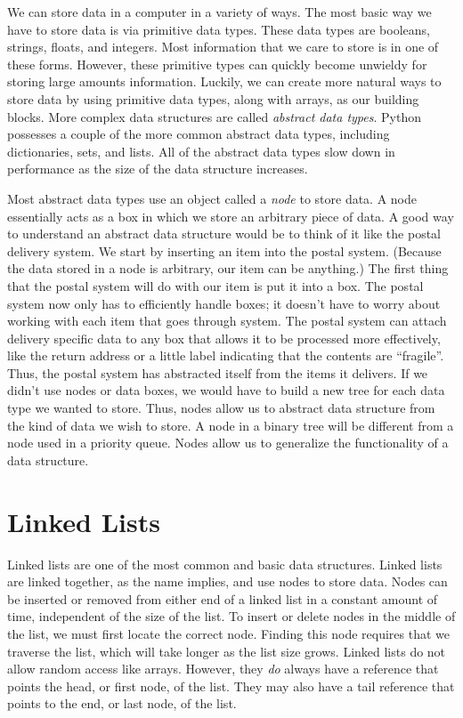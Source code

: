 \label{lab:Python_DataStructures}

We can store data in a computer in a variety of ways.
The most basic way we have to store data is via primitive data types.
These data types are booleans, strings, floats, and integers.
Most information that we care to store is in one of these forms.
However, these primitive types can quickly become unwieldy for storing large amounts information.
Luckily, we can create more natural ways to store data by using primitive data types, along with arrays, as our building blocks.
More complex data structures are called \emph{abstract data types}.
Python possesses a couple of the more common abstract data types, including dictionaries, sets, and lists.
All of the abstract data types slow down in performance as the size of the data structure increases.

Most abstract data types use an object called a \emph{node} to store data.
A node essentially acts as a box in which we store an arbitrary piece of data.
A good way to understand an abstract data structure would be to think of it like the postal delivery system.
We start by inserting an item into the postal system.  (Because the data stored in a node is arbitrary, our item can be anything.)
The first thing that the postal system will do with our item is put it into a box.
The postal system now only has to efficiently handle boxes;
it doesn't have to worry about working with each item that goes through system.
The postal system can attach delivery specific data to any box that allows it to be processed more effectively, 
like the return address or a little label indicating that the contents are ``fragile''.
Thus, the postal system has abstracted itself from the items it delivers.
If we didn't use nodes or data boxes, we would have to build a new tree for each data type we wanted to store.
Thus, nodes allow us to abstract data structure from the kind of data we wish to store.
A node in a binary tree will be different from a node used in a priority queue.
Nodes allow us to generalize the functionality of a data structure.

\section*{Linked Lists}
Linked lists are one of the most common and basic data structures.
Linked lists are linked together, as the name implies, and use nodes to store data.
Nodes can be inserted or removed from either end of a linked list in a constant amount of time, independent of the size of the list.
To insert or delete nodes in the middle of the list, we must first locate the correct node.
Finding this node requires that we traverse the list, which will take longer as the list size grows.
Linked lists do not allow random access like arrays.
However, they \emph{do} always have a reference that points the head, or first node, of the list.
They may also have a tail reference that points to the end, or last node, of the list.

